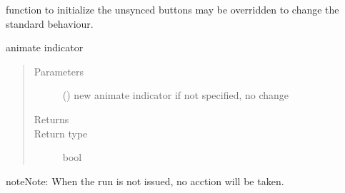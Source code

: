 \documentclass[letterpaper,10pt,english]{sphinxmanual}
\begin{document}
\begin{fulllineitems}
\begin{fulllineitems}
\end{fulllineitems}


\begin{fulllineitems}
\label{\detokenize{Reference:salabim.Environment.an_unsynced_buttons}}
function to initialize the unsynced buttons 
may be overridden to change the standard behaviour.

\end{fulllineitems}


\begin{fulllineitems}
\label{\detokenize{Reference:salabim.Environment.animate}}
animate indicator
\begin{quote}\begin{description}
\item[{Parameters}] \leavevmode
{} () \textendash{} new animate indicator 
if not specified, no change

\item[{Returns}] \leavevmode
{}

\item[{Return type}] \leavevmode
bool

\end{description}\end{quote}

\begin{sphinxadmonition}{note}{Note:}
When the run is not issued, no acction will be taken.
\end{sphinxadmonition}

\end{fulllineitems}



\end{fulllineitems}
\end{document}
